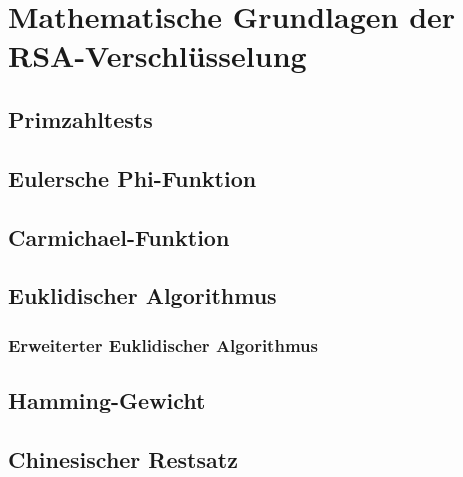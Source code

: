 \chapter{Mathematische Grundlagen der RSA-Verschlüsselung}


\newpage

\section{Primzahltests}

\newpage


\newpage

\section{Eulersche Phi-Funktion}
\newpage

\section{Carmichael-Funktion}
\newpage

\section{Euklidischer Algorithmus}
\newpage

\subsection{Erweiterter Euklidischer Algorithmus}
\newpage

\section{Hamming-Gewicht}
\newpage

\section{Chinesischer Restsatz}
